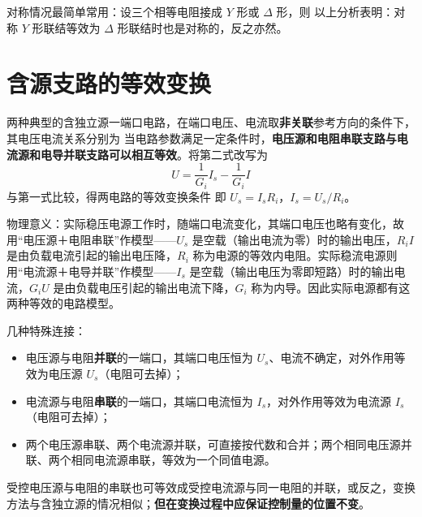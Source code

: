 对称情况最简单常用：设三个相等电阻接成 $Y$ 形或 $\Delta$ 形，则
以上分析表明：对称 $Y$ 形联结等效为 $\Delta$ 形联结时也是对称的，反之亦然。


\section{含源支路的等效变换}
两种典型的含独立源一端口电路，在端口电压、电流取\textbf{非关联}参考方向的条件下，其电压电流关系分别为
当电路参数满足一定条件时，\textbf{电压源和电阻串联支路与电流源和电导并联支路可以相互等效}。将第二式改写为
\begin{equation}
U=\frac{1}{G_i}I_s-\frac{1}{G_i}I
\end{equation}
与第一式比较，得两电路的等效变换条件
即 $U_s=I_sR_i$，$I_s=U_s/R_i$。

物理意义：实际稳压电源工作时，随端口电流变化，其端口电压也略有变化，故用“电压源＋电阻串联”作模型——$U_s$ 是空载（输出电流为零）时的输出电压，$R_iI$ 是由负载电流引起的输出电压降，$R_i$ 称为电源的等效内电阻。实际稳流电源则用“电流源＋电导并联”作模型——$I_s$ 是空载（输出电压为零即短路）时的输出电流，$G_iU$ 是由负载电压引起的输出电流下降，$G_i$ 称为内导。因此实际电源都有这两种等效的电路模型。

几种特殊连接：
\begin{itemize}
  \item 电压源与电阻\textbf{并联}的一端口，其端口电压恒为 $U_s$、电流不确定，对外作用等效为电压源 $U_s$（电阻可去掉）；
  \item 电流源与电阻\textbf{串联}的一端口，其端口电流恒为 $I_s$，对外作用等效为电流源 $I_s$（电阻可去掉）；
  \item 两个电压源串联、两个电流源并联，可直接按代数和合并；两个相同电压源并联、两个相同电流源串联，等效为一个同值电源。
\end{itemize}

受控电压源与电阻的串联也可等效成受控电流源与同一电阻的并联，或反之，变换方法与含独立源的情况相似；\textbf{但在变换过程中应保证控制量的位置不变}。


